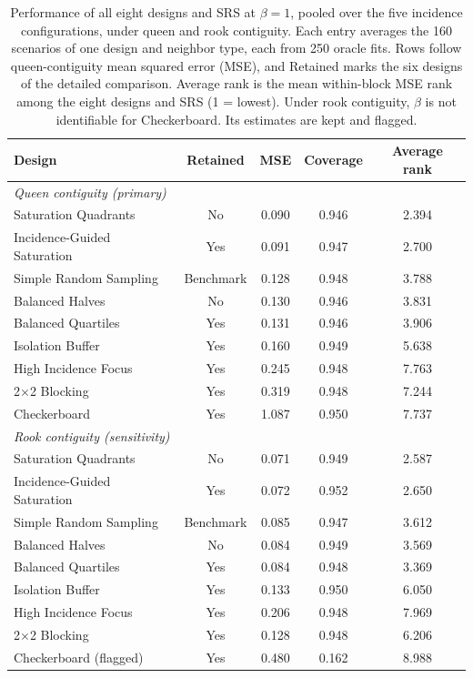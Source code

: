 \documentclass[11pt]{article}
\begin{document}
\iffullsi
\begin{table}[!htb]

\small
\centering

\caption{Performance of all eight designs and SRS at $\beta = 1$, pooled over the five incidence configurations, under queen and rook contiguity. Each entry averages the 160 scenarios of one design and neighbor type, each from 250 oracle fits. Rows follow queen-contiguity mean squared error (MSE), and Retained marks the six designs of the detailed comparison. Average rank is the mean within-block MSE rank among the eight designs and SRS (1 = lowest). Under rook contiguity, $\beta$ is not identifiable for Checkerboard. Its estimates are kept and flagged.}
\label{tab:eight-design}

\begin{tabular}{lcccc}

\toprule
Design & Retained & MSE & Coverage & Average rank \\

\midrule
\multicolumn{5}{l}{\textit{Queen contiguity (primary)}} \\
Saturation Quadrants & No & 0.090 & 0.946 & 2.394 \\
Incidence-Guided Saturation & Yes & 0.091 & 0.947 & 2.700 \\
Simple Random Sampling & Benchmark & 0.128 & 0.948 & 3.788 \\
Balanced Halves & No & 0.130 & 0.946 & 3.831 \\
Balanced Quartiles & Yes & 0.131 & 0.946 & 3.906 \\
Isolation Buffer & Yes & 0.160 & 0.949 & 5.638 \\
High Incidence Focus & Yes & 0.245 & 0.948 & 7.763 \\
2$\times$2 Blocking & Yes & 0.319 & 0.948 & 7.244 \\
Checkerboard & Yes & 1.087 & 0.950 & 7.737 \\

\midrule
\multicolumn{5}{l}{\textit{Rook contiguity (sensitivity)}} \\
Saturation Quadrants & No & 0.071 & 0.949 & 2.587 \\
Incidence-Guided Saturation & Yes & 0.072 & 0.952 & 2.650 \\
Simple Random Sampling & Benchmark & 0.085 & 0.947 & 3.612 \\
Balanced Halves & No & 0.084 & 0.949 & 3.569 \\
Balanced Quartiles & Yes & 0.084 & 0.948 & 3.369 \\
Isolation Buffer & Yes & 0.133 & 0.950 & 6.050 \\
High Incidence Focus & Yes & 0.206 & 0.948 & 7.969 \\
2$\times$2 Blocking & Yes & 0.128 & 0.948 & 6.206 \\
Checkerboard (flagged) & Yes & 0.480 & 0.162 & 8.988 \\

\bottomrule

\end{tabular}

\end{table}
\fi
\end{document}
